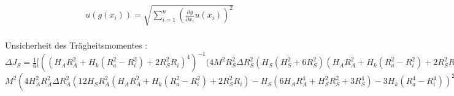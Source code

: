 \begin{align}
	u(g(x_i))=   \sqrt{  \sum_{i=1}^{n} \left( \frac{\partial g}{\partial x_i} u(x_i) \right)^2  }
	\label{eq:kombsu}       
\end{align}\\






Unsicherheit des Trägheitsmomentes :\\
$\Delta J_S= \frac{1}{6} [ ((H_{A} R_{A}^{2} + H_{k} (R_{a}^{2} - R_{i}^{2}) + 2 R_{S}^{2} R_{i})^{4})^{-1} (4 M^{2} R_{S}^{2} \Delta R_{S}^{2} (H_{S} (H_{S}^{2} + 6 R_{S}^{2}) (H_{A} R_{A}^{2} + H_{k} (R_{a}^{2} - R_{i}^{2}) + 2 R_{S}^{2} R_{i}) - 2 R_{i} (H_{S} (6 H_{A} R_{A}^{4} + H_{S}^{2} R_{S}^{2} + 3 R_{S}^{4}) + 3 H_{k} (R_{a}^{4} - R_{i}^{4})))^{2} +$ \\
$M^{2} (4 H_{A}^{2} R_{A}^{2} \Delta R_{A}^{2} (12 H_{S} R_{A}^{2} (H_{A} R_{A}^{2} + H_{k} (R_{a}^{2} - R_{i}^{2}) + 2 R_{S}^{2} R_{i}) - H_{S} (6 H_{A} R_{A}^{4} + H_{S}^{2} R_{S}^{2} + 3 R_{S}^{4}) - 3 H_{k} (R_{a}^{4} - R_{i}^{4}))^{2} + 4 H_{k}^{2} R_{a}^{2} \Delta R_{a}^{2} (- H_{S} (6 H_{A} R_{A}^{4} + H_{S}^{2} R_{S}^{2} + 3 R_{S}^{4}) - 3 H_{k} (R_{a}^{4} - R_{i}^{4}) + 6.0 R_{a}^{2} (H_{A} R_{A}^{2} + H_{k} (R_{a}^{2} - R_{i}^{2}) + 2 R_{S}^{2} R_{i}))^{2} + R_{A}^{4} \Delta H_{A}^{2} (6 H_{S} R_{A}^{2} (H_{A} R_{A}^{2} + H_{k} (R_{a}^{2} - R_{i}^{2}) + 2 R_{S}^{2} R_{i}) - H_{S}  (6 H_{A} R_{A}^{4} + H_{S}^{2} R_{S}^{2} + 3 R_{S}^{4} ) - 3 H_{k}  (R_{a}^{4} - R_{i}^{4} ) )^{2} + \Delta H_{k}^{2}  ( (R_{a}^{2} - R_{i}^{2} )  (H_{S}  (6 H_{A} R_{A}^{4} + H_{S}^{2} R_{S}^{2} + 3 R_{S}^{4} ) + 3 H_{k}  (R_{a}^{4} - R_{i}^{4} ) ) - 3  (R_{a}^{4} - R_{i}^{4} )  (H_{A} R_{A}^{2} + H_{k}  (R_{a}^{2} - R_{i}^{2} ) + 2 R_{S}^{2} R_{i} ) )^{2} + \Delta R_{i}^{2}  (12.0 H_{k} R_{i}^{3}  (H_{A} R_{A}^{2} + H_{k}  (R_{a}^{2} - R_{i}^{2} ) + 2 R_{S}^{2} R_{i} ) - 2  (H_{S}  (6 H_{A} R_{A}^{4} + H_{S}^{2} R_{S}^{2} + 3 R_{S}^{4} ) + 3 H_{k}  (R_{a}^{4} - R_{i}^{4} ) )  (H_{k} R_{i} - R_{S}^{2} ) )^{2} ) +  (9 M^{2} \Delta H_{S}^{2}  (2 H_{A} R_{A}^{4} + H_{S}^{2} R_{S}^{2} + R_{S}^{4} )^{2} + \Delta M^{2}  (H_{S}  (6 H_{A} R_{A}^{4} + H_{S}^{2} R_{S}^{2} + 3 R_{S}^{4} ) + 3 H_{k}  (R_{a}^{4} - R_{i}^{4} ) )^{2} )  (H_{A} R_{A}^{2} + H_{k}  (R_{a}^{2} - R_{i}^{2} ) + 2 R_{S}^{2} R_{i} )^{2} )  ]^{\frac{1}{2}} $
\begin{align}
\label{eq:uJfall}
\end{align}






